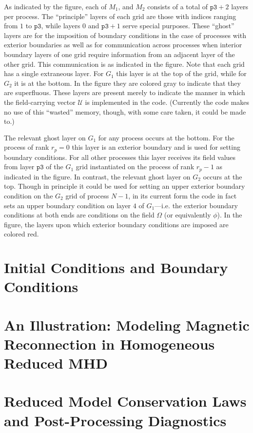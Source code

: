 \documentclass[12pt, letterpaper, oneside, leqno, openright]{memoir}
\newcommand{\ufield}{\mathscr{U}}
\begin{document}
%
As indicated by the figure, each of $M_1$, and $M_2$ consists of a total
of $\mathtt{p3}+2$ layers per process.  The ``principle'' layers of
each grid are those with indices ranging from $1$ to $\mathtt{p3}$,
while layers $0$ and $\mathtt{p3}+1$ serve special purposes. These ``ghost''
layers are for the imposition of boundary conditions in the case of
processes with exterior boundaries as well as for communication across
processes when interior boundary layers of one grid require information
from an adjacent layer of the other grid. This communication is as
indicated in the figure. Note that each grid has a single extraneous layer. 
For $G_1$ this layer is at the top of the grid, while for $G_2$ it is at 
the bottom. In the figure they are colored gray to indicate that they
are superfluous.  These layers are present merely to indicate the
manner in which the field-carrying vector $\ufield$ is implemented in
the code. (Currently the code makes no use of this ``wasted'' memory,
though, with some care taken, it could be made to.)
%
\par
%
The relevant ghost layer on $G_1$ for any process occurs at the
bottom. For the process of rank $r_p=0$ this layer is an exterior
boundary and is used for setting boundary conditions. For all other
processes this layer receives its field values from layer $\mathtt{p3}$
of the $G_1$ grid instantiated on the process of rank $r_p-1$ as
indicated in the figure. In contrast, the relevant ghost layer
on $G_2$ occurs at the top. Though in principle it could be used
for setting an upper exterior boundary condition on the $G_2$
grid of process $N-1$, in its current form the code in fact
sets an upper boundary condition on layer $4$ of $G_1$---i.e.
the exterior boundary conditions at both ends are conditions on the 
field $\Omega$ (or equivalently $\phi$). In the figure, the layers
upon which exterior boundary conditions are imposed are colored red.
%
\chapter{Initial Conditions and Boundary Conditions}
%
\chapter{An Illustration: Modeling Magnetic Reconnection in Homogeneous Reduced MHD}
%
\chapter{Reduced Model Conservation Laws and Post-Processing Diagnostics}
%
\end{document}
